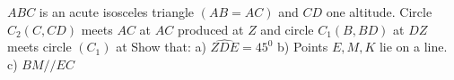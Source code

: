 $ABC$ is an acute isosceles triangle $(AB=AC)$ and $CD$ one altitude. Circle $C_2(C,CD)$ meets $AC$ at  $AC$ produced at $Z$ and circle $C_1(B, BD)$ at  $DZ$ meets circle $(C_1)$ at  Show that:
a) $\widehat{ZDE}=45^0$
b) Points $E, M, K$ lie on a line.
c) $BM//EC$